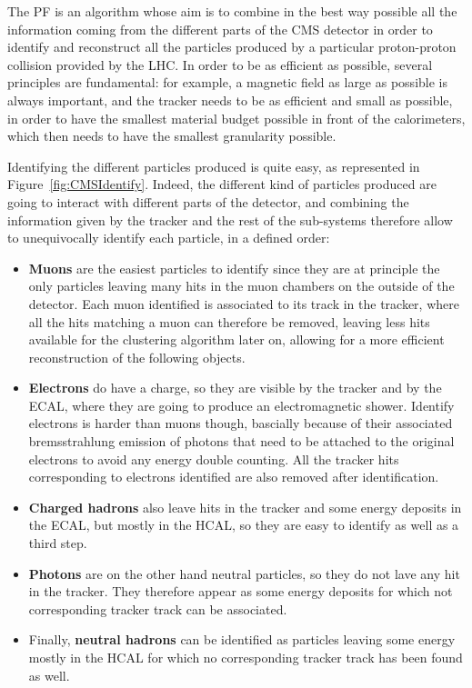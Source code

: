 \documentclass[a4paper, 10pt, openright]{report}
\begin{document}
The \acf{PF} is an algorithm whose aim is to combine in the best way possible all the information coming from the different parts of the \ac{CMS} detector in order to identify and reconstruct all the particles produced by a particular proton-proton collision provided by the \ac{LHC}. In order to be as efficient as possible, several principles are fundamental: for example, a magnetic field as large as possible is always important, and the tracker needs to be as efficient and small as possible, in order to have the smallest material budget possible in front of the calorimeters, which then needs to have the smallest granularity possible. 

Identifying the different particles produced is quite easy, as represented in Figure~\ref{fig:CMSIdentify}. Indeed, the different kind of particles produced are going to interact with different parts of the detector, and combining the information given by the tracker and the rest of the sub-systems therefore allow to unequivocally identify each particle, in a defined order:

\begin{itemize}
\item \textbf{Muons} are the easiest particles to identify since they are at principle the only particles leaving many hits in the muon chambers on the outside of the detector. Each muon identified is associated to its track in the tracker, where all the hits matching a muon can therefore be removed, leaving less hits available for the clustering algorithm later on, allowing for a more efficient reconstruction of the following objects.
\item \textbf{Electrons} do have a charge, so they are visible by the tracker and by the \ac{ECAL}, where they are going to produce an electromagnetic shower. Identify electrons is harder than muons though, bascially because of their associated bremsstrahlung emission of photons that need to be attached to the original electrons to avoid any energy double counting. All the tracker hits corresponding to electrons identified are also removed after identification.
\item \textbf{Charged hadrons} also leave hits in the tracker and some energy deposits in the \ac{ECAL}, but mostly in the \ac{HCAL}, so they are easy to identify as well as a third step.
\item \textbf{Photons} are on the other hand neutral particles, so they do not lave any hit in the tracker. They therefore appear as some energy deposits for which not corresponding tracker track can be associated.
\item Finally, \textbf{neutral hadrons} can be identified as particles leaving some energy mostly in the \ac{HCAL} for which no corresponding tracker track has been found as well.
\end{itemize}
\end{document}
